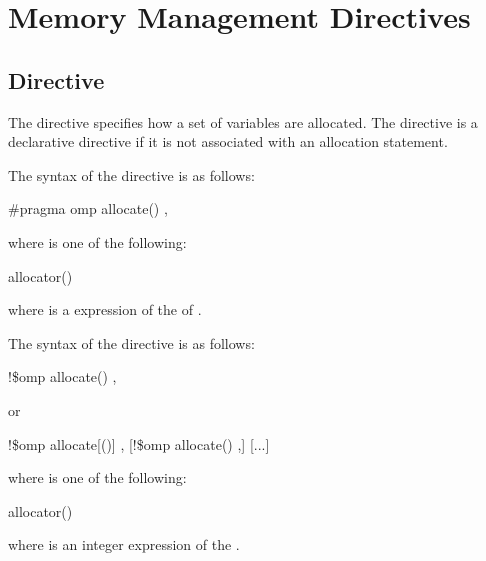 \section{Memory Management Directives}
\label{sec:Memory Management Directives}


\subsection{ Directive}
\label{subsec:allocate Directive}
\summary

The  directive specifies how a set of variables are allocated. The  directive is a declarative directive if it is not associated with an allocation statement.

\syntax
\begin{ccppspecific}
The syntax of the  directive is as follows:

\begin{boxedcode}
\#pragma omp allocate() \plc{[clause[ [ [},\plc{] clause] ... ]] new-line}
\end{boxedcode}

where  is one of the following:

\begin{indentedcodelist}
allocator()
\end{indentedcodelist}

where  is a expression of the of .

\end{ccppspecific}
\medskip

\begin{fortranspecific}
The syntax of the  directive is as follows:

\begin{boxedcode}
!\$omp allocate() \plc{[clause[ [ [},\plc{] clause] ... ]]}
\end{boxedcode}

or
\begin{boxedcode}
!\$omp allocate[()] \plc{clause[ [ [},\plc{] clause] ... ]}
[!\$omp allocate() \plc{clause[ [ [},\plc{] clause] ... ]}]
[...]
\end{boxedcode}

where  is one of the following:

\begin{indentedcodelist}
allocator()
\end{indentedcodelist}

where  is an integer expression of the  .

\end{fortranspecific}

